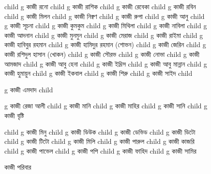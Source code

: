 \documentclass{article}
\begin{document}
\begin{figure}
{\begin{genealogypicture}
{{{{              child{    g{ কাজী রনো  } child{    g{ কাজী রাশিক  }   }   }
              child{    g{ কাজী রেবেকা } 
                  child{    g{ কাজী রবিন }   }
                  child{    g{ কাজী মিলন }   }
                  child{    g{ কাজী নিক্বণ }   }
                  child{    g{ কাজী রুপা }   }
              }
              child{    g{ কাজী আনু  } child{    g{ কাজী সূচনা }   }  }
              child{    g{ কাজী কুমকুম}
                    child{    g{ কাজী মিথিলা}   }
                    child{    g{ কাজী নাবিলা }   }
                    child{    g{ কাজী আদনান }   }
              }
              child{    g{ কাজী মুনমুন }
                  child{    g{ কাজী মেরাজ }   }
                  child{    g{ কাজী রাইমা }   }
              }
          }
          child{    g{ কাজী হাবিবুর রহমান }  
              child{    g{ কাজী হামিদুর রহমান (শোভন)  }
                  child{ g{ কাজী জেরিন }  }
              }
              child{    g{ কাজী রশিদুল হাসান (খোকন)  }
                  child{ g{ কাজী সৌরভ }  }
                  child{ g{ কাজী নোভা }  }
              }
          }
          child{    g{ কাজী আমজাদ } 
          child{    g{ কাজী আবু হেনা }   }
          child{    g{ কাজী ইদ্রিস }   }
          child{    g{ কাজী আবু মান্নান }   }
          child{    g{ কাজী হুমায়ুন }   }
          child{    g{ কাজী ইকবাল }   }
          child{    g{ কাজী শিরু }   }
          child{    g{ কাজী সাইদ }   }
          }
          child{    g{ কাজী এমদাদ } 
              child{    g{ কাজী রেজা আলী } 
                    child{    g{ কাজী মানি }
                        child{    g{ কাজী মাহির   }     }
                          }
                    child{    g{ কাজী সানি } child{    g{ কাজী বৃষ্টি  }     }  }

              }
              child{    g{ কাজী মিনু  } 
              child{    g{ কাজী ডিউক }   }
              child{    g{ কাজী ডেভিড }   }
              child{    g{ কাজী ডিটো }   }
              child{    g{ কাজী টিটো }   }
              }
              child{    g{ কাজী মিলি }   }
              child{    g{ কাজী পারুল }
                  child{    g{ কাজী কাজরি }   }
                  child{    g{ কাজী পাভেল }   }
              }
              child{    g{ কাজী পপি }
                  child{    g{ কাজী ফাহিদ }   }
                  child{    g{ কাজী সামির }   }
              }

          }

      }
    }
    }
    \end{genealogypicture}
    }
    \begin{comment}
      child{
        g{ কাজী }

      }
      \end{comment}
    \caption{কাজী পরিবার}
    \end{figure}
    
\end{document}
